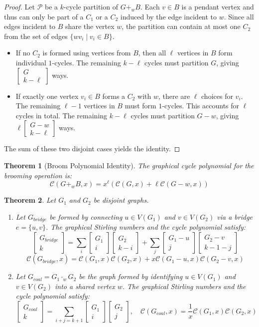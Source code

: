 \documentclass{amsart}
\newcounter{cases}
\newtheorem{theorem}{Theorem}[section]
\theoremstyle{definition}
\def\st#1#2{\begin{bmatrix} #1 \\ #2 \end{bmatrix}}
\begin{document}
\begin{proof}
Let $\mathcal{P}$ be a $k$-cycle partition of $G+_w B$. Each $v \in B$ is a pendant vertex and thus can only be part of a $C_1$ or a $C_2$ induced by the edge incident to $w$. Since all edges incident to $B$ share the vertex $w$, the partition can contain at most one $C_2$ from the set of edges $\{wv_i \mid v_i \in B\}$.
\begin{itemize}
    \item If no $C_2$ is formed using vertices from $B$, then all $\ell$ vertices in $B$ form individual $1$-cycles. The remaining $k-\ell$ cycles must partition $G$, giving $\st{G}{k-\ell}$ ways.
    \item If exactly one vertex $v_i \in B$ forms a $C_2$ with $w$, there are $\ell$ choices for $v_i$. The remaining $\ell-1$ vertices in $B$ must form $1$-cycles. This accounts for $\ell$ cycles in total. The remaining $k-\ell$ cycles must partition $G-w$, giving $\ell \st{G-w}{k-\ell}$ ways.
\end{itemize}
The sum of these two disjoint cases yields the identity.
\end{proof}

\begin{theorem}[Broom Polynomial Identity]
The graphical cycle polynomial for the brooming operation is:
\begin{equation*}
    \mathcal{C}(G+_w B, x) = x^\ell \left( \mathcal{C}(G, x) + \ell \mathcal{C}(G-w, x) \right)
\end{equation*}
\end{theorem}
\begin{theorem}\label{Bri}
Let $G_1$ and $G_2$ be disjoint graphs.
\begin{enumerate}
    \item  Let $G_{bridge}$ be formed by connecting $u \in V(G_1)$ and $v \in V(G_2)$ via a bridge $e = \{u, v\}$. The graphical Stirling numbers and the cycle polynomial satisfy:
    \begin{equation*}
        \st{G_{bridge}}{k} = \sum_{i} \st{G_1}{i} \st{G_2}{k-i} + \sum_{j} \st{G_1 - u}{j} \st{G_2 - v}{k-1-j}
    \end{equation*}
    \begin{equation*}
        \mathcal{C}(G_{bridge}, x) = \mathcal{C}(G_1, x) \mathcal{C}(G_2, x) + x \mathcal{C}(G_1 - u, x) \mathcal{C}(G_2 - v, x)
    \end{equation*}
    
    \item  Let $G_{coal} = G_1 \cdot_w G_2$ be the graph formed by identifying $u \in V(G_1)$ and $v \in V(G_2)$ into a shared vertex $w$. The graphical Stirling numbers and the cycle polynomial satisfy:
    \begin{equation*}
        \st{G_{coal}}{k} = \sum_{i+j=k+1} \st{G_1}{i} \st{G_2}{j}, \quad \mathcal{C}(G_{coal}, x) = \frac{1}{x} \mathcal{C}(G_1, x) \mathcal{C}(G_2, x)
    \end{equation*}
\end{enumerate}
\end{theorem}
\end{document}
